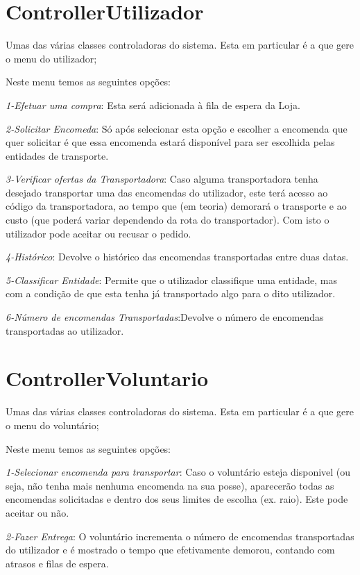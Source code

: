 \documentclass[a4paper]{report}
\begin{document}
    \section{ControllerUtilizador}
    Umas das várias classes controladoras do sistema. Esta em particular é a que gere o menu do utilizador; 
    
      Neste menu temos as seguintes opções:
      
      \textit{1-Efetuar uma compra}: Esta será adicionada à fila de espera da Loja.
      
      \textit{2-Solicitar Encomeda}: Só após selecionar esta opção e escolher a encomenda que quer solicitar é que essa encomenda estará disponível para ser escolhida pelas entidades de transporte.
      
      \textit{3-Verificar ofertas da Transportadora}: Caso alguma transportadora tenha desejado transportar uma das encomendas do  utilizador, este terá acesso ao código da transportadora, ao tempo que (em teoria) demorará o transporte e ao custo (que poderá variar dependendo da rota do transportador). Com isto o utilizador pode aceitar ou recusar o pedido.
      
      \textit{4-Histórico}: Devolve o histórico das encomendas transportadas entre duas datas.
      
      \textit{5-Classificar Entidade}: Permite que o utilizador classifique uma entidade, mas com a condição de que esta tenha já transportado algo para o dito utilizador. 
      
      \textit{6-Número de encomendas Transportadas}:Devolve o número de encomendas transportadas ao utilizador.
    
	\section{ControllerVoluntario}
	   Umas das várias classes controladoras do sistema. Esta em particular é a que gere o menu do voluntário;
	   
	   Neste menu temos as seguintes opções:
	   
	   \textit{1-Selecionar encomenda para transportar}: Caso o voluntário esteja disponivel (ou seja, não tenha mais nenhuma encomenda na sua posse), aparecerão todas as encomendas solicitadas e dentro dos seus limites de escolha (ex. raio). Este pode aceitar ou não.
	   
	   \textit{2-Fazer Entrega}: O voluntário incrementa o número de encomendas transportadas do utilizador e é mostrado o tempo que efetivamente demorou, contando com atrasos e filas de espera.
	   
\end{document}
